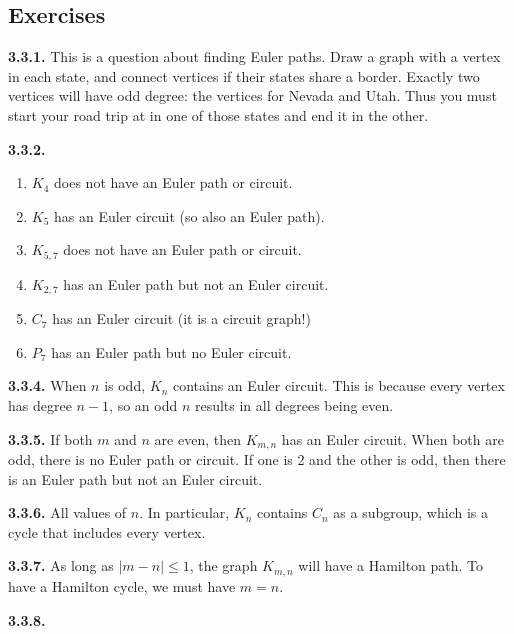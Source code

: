 \documentclass[12pt,]{book}
\theoremstyle{plain}
\theoremstyle{definition}
\theoremstyle{definition}
\theoremstyle{definition}
\numberwithin{equation}{chapter}
\begin{document}
\subsection*{ Exercises}
\noindent\textbf{3.3.1.} \hypertarget{p-1698}{}%
This is a question about finding Euler paths. Draw a graph with a vertex in each state, and connect vertices if their states share a border. Exactly two vertices will have odd degree: the vertices for Nevada and Utah. Thus you must start your road trip at in one of those states and end it in the other.%
\par\smallskip
\noindent\textbf{3.3.2.} \hypertarget{p-1700}{}%
\leavevmode%
\begin{enumerate}[label=(\alph*)]
\item\hypertarget{li-751}{}\(K_4\) does not have an Euler path or circuit.%
\item\hypertarget{li-752}{}\(K_5\) has an Euler circuit (so also an Euler path).%
\item\hypertarget{li-753}{}\(K_{5,7}\) does not have an Euler path or circuit.%
\item\hypertarget{li-754}{}\(K_{2,7}\) has an Euler path but not an Euler circuit.%
\item\hypertarget{li-755}{}\(C_7\) has an Euler circuit (it is a circuit graph!)%
\item\hypertarget{li-756}{}\(P_7\) has an Euler path but no Euler circuit.%
\end{enumerate}
%
\par\smallskip
\noindent\textbf{3.3.4.} \hypertarget{p-1707}{}%
When \(n\) is odd, \(K_n\) contains an Euler circuit. This is because every vertex has degree \(n-1\), so an odd \(n\) results in all degrees being even.%
\par\smallskip
\noindent\textbf{3.3.5.} \hypertarget{p-1709}{}%
If both \(m\) and \(n\) are even, then \(K_{m,n}\) has an Euler circuit. When both are odd, there is no Euler path or circuit. If one is 2 and the other is odd, then there is an Euler path but not an Euler circuit.%
\par\smallskip
\noindent\textbf{3.3.6.} \hypertarget{p-1711}{}%
All values of \(n\). In particular, \(K_n\) contains \(C_n\) as a subgroup, which is a cycle that includes every vertex.%
\par\smallskip
\noindent\textbf{3.3.7.} \hypertarget{p-1713}{}%
As long as \(|m-n| \le 1\), the graph \(K_{m,n}\) will have a Hamilton path. To have a Hamilton cycle, we must have \(m=n\).%
\par\smallskip
\noindent\textbf{3.3.8.} \hypertarget{p-1715}{}%
\end{document}
